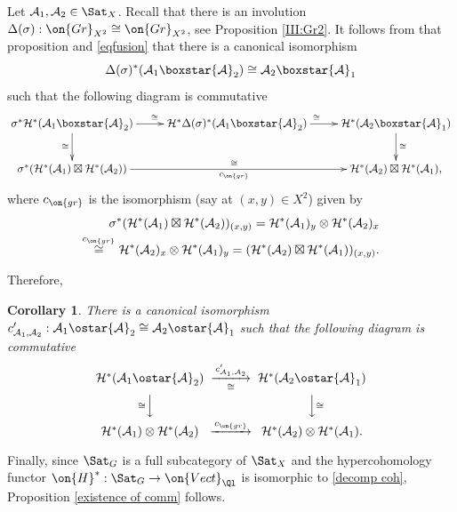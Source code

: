 \documentclass[]{pcmi}
\theoremstyle{plain}
\newtheorem{cor}[equation]{Corollary}
\theoremstyle{remark}
\theoremstyle{definition}
\newcommand{\mA}{{\mathcal A}}
\newcommand{\mH}{{\mathcal H}}
\newcommand{\Gr}{{\on{Gr}}}
\begin{document}
Let $\mA_1,\mA_2\in\Sat_X$. 
Recall that there is an involution $\Delta(\sigma):\Gr_{X^2}\cong\Gr_{X^2}$, see Proposition \ref{III:Gr2}. It follows from that proposition and \eqref{eqfusion} that 
there is a canonical isomorphism 
$$\Delta(\sigma)^*(\mA_1\boxstar\mA_2)\cong \mA_2\boxstar\mA_1$$ 
such that the following diagram is commutative
\[\xymatrix{
\sigma^*\mH^*(\mA_1\boxstar\mA_2)\ar^\cong[r]\ar_\cong[d]& \mH^*\Delta(\sigma)^*(\mA_1\boxstar\mA_2)\ar^\cong[r]&\mH^*(\mA_2\boxstar\mA_1)\ar^\cong[d]\\
\sigma^*(\mH^*(\mA_1)\boxtimes\mH^*(\mA_2))\ar_{c_{\on{gr}}}^\cong[rr]&&\mH^*(\mA_2)\boxtimes\mH^*(\mA_1),
}\]
where $c_{\on{gr}}$ is the isomorphism (say at $(x,y)\in X^2$) given by
\[\begin{split}\sigma^*(\mH^*(\mA_1)\boxtimes\mH^*(\mA_2))_{(x,y)}=\mH^*(\mA_1)_y\otimes\mH^*(\mA_2)_x \\ \stackrel{c_{\on{gr}}}{\cong}\mH^*(\mA_2)_x\otimes \mH^*(\mA_1)_y=(\mH^*(\mA_2)\boxtimes\mH^*(\mA_1))_{(x,y)}.
\end{split}\]


Therefore, 
\begin{cor}\label{existence of comm2}
There is a canonical isomorphism $c'_{\mA_1,\mA_2}:\mA_1\ostar\mA_2\cong\mA_2\ostar\mA_1$ such that the following diagram is commutative
\[\begin{CD}
\mH^*(\mA_1\ostar\mA_2)@>c'_{\mA_1,\mA_2}>\cong>\mH^*(\mA_2\ostar\mA_1)\\
@V\cong VV@VV\cong V\\
\mH^*(\mA_1)\otimes\mH^*(\mA_2)@>c_{\on{gr}}>>\mH^*(\mA_2)\otimes\mH^*(\mA_1).
\end{CD}\]
\end{cor}
Finally, since $\Sat_G$ is a full subcategory of  $\Sat_X$ and the hypercohomology functor $\on{H}^*:\Sat_G\to \on{Vect}_{\Ql}$ is isomorphic to \eqref{decomp coh}, Proposition \ref{existence of comm} follows.
\end{document}
